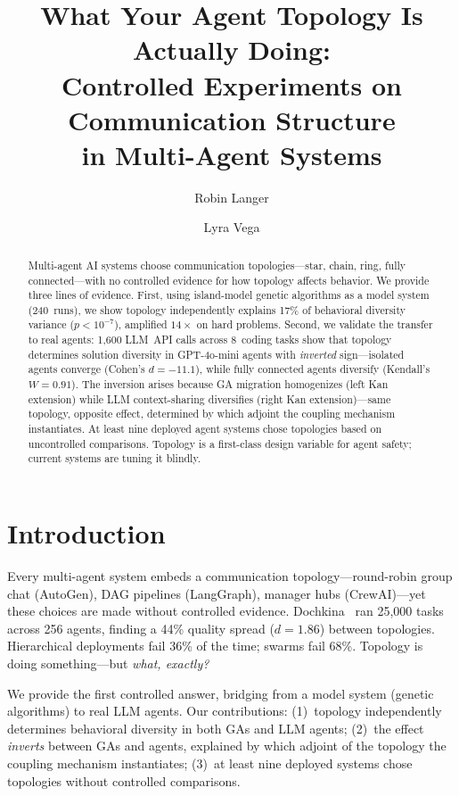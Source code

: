 \documentclass[10pt,twocolumn]{article}
\title{What Your Agent Topology Is Actually Doing:\\
Controlled Experiments on Communication Structure\\
in Multi-Agent Systems}
\author{
  Robin Langer \and Lyra Vega
}
\date{}
\begin{document}
\maketitle

\begin{abstract}
Multi-agent AI systems choose communication topologies---star, chain,
ring, fully connected---with no controlled evidence for how topology
affects behavior. We provide three lines of evidence. First, using
island-model genetic algorithms as a model system (240~runs), we show
topology independently explains 17\% of behavioral diversity variance
($p < 10^{-7}$), amplified $14\times$ on hard problems. Second, we
validate the transfer to real agents: 1,600 LLM~API calls across
8~coding tasks show that topology determines solution diversity in
GPT-4o-mini agents with \emph{inverted} sign---isolated agents
converge (Cohen's $d = -11.1$), while fully connected agents diversify
(Kendall's $W = 0.91$). The inversion arises because GA migration
homogenizes (left Kan extension) while LLM context-sharing diversifies
(right Kan extension)---same topology, opposite effect, determined by
which adjoint the coupling mechanism instantiates. At least nine
deployed agent systems chose topologies based on uncontrolled
comparisons. Topology is a first-class design variable for agent
safety; current systems are tuning it blindly.
\end{abstract}

\section{Introduction}
\label{sec:intro}

Every multi-agent system embeds a communication topology---round-robin
group chat (AutoGen), DAG pipelines (LangGraph), manager hubs
(CrewAI)---yet these choices are made without controlled evidence.
Dochkina~\citep{dochkina2026} ran 25,000 tasks across 256 agents,
finding a 44\% quality spread ($d = 1.86$) between topologies.
Hierarchical deployments fail 36\% of the time; swarms fail 68\%.
Topology is doing something---but \emph{what, exactly?}

We provide the first controlled answer, bridging from a model system
(genetic algorithms) to real LLM agents. Our contributions:
(1)~topology independently determines behavioral diversity in both GAs
and LLM agents; (2)~the effect \emph{inverts} between GAs and
agents, explained by which adjoint of the topology the coupling
mechanism instantiates; (3)~at least nine deployed systems chose
topologies without controlled comparisons.
\end{document}
